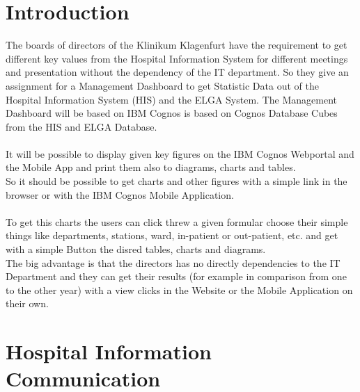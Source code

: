 \documentclass[a4paper]{article}
\begin{document}
	\section{Introduction}
	The boards of directors of the Klinikum Klagenfurt have the requirement to get
	different key values from the Hospital Information System for different
	meetings and presentation without the dependency of the IT department.
	So they	give an assignment for a Management Dashboard to get Statistic Data out of the
	Hospital Information System (HIS) and the ELGA System. The Management Dashboard
	will be based on IBM Cognos is based on Cognos Database Cubes from the HIS and
	ELGA Database.\\
	\\
	It will be possible to display given key figures on the IBM Cognos
	Webportal and the Mobile App and print them also to diagrams, charts and tables.\\
	So it should be possible to get charts and other figures with a simple link in
	the browser or with the IBM Cognos Mobile Application.\\
	\\
	To get this charts the users can click threw a given formular choose their
	simple things like departments, stations, ward, in-patient or out-patient, etc.
	and get with a simple Button the disred tables, charts and diagrams.\\
	The big advantage is that the directors has no directly dependencies to the IT
	Department and they can get their results (for example in comparison from one
	to the other year) with a view clicks in the Website or the Mobile Application
	on their own. 
	\newpage
	
	\section{Hospital Information Communication}
\end{document}

